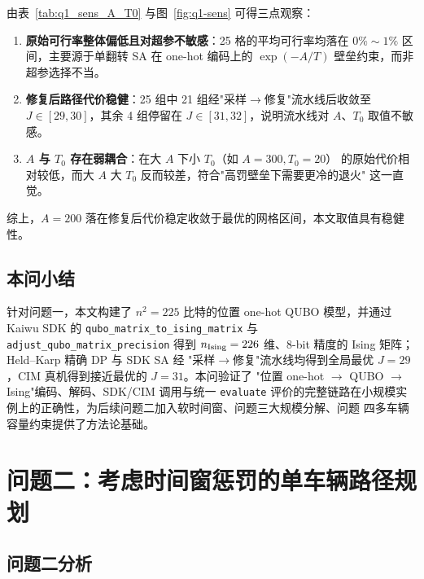 \documentclass[UTF8,12pt,a4paper]{ctexart}
\begin{document}
由表~\ref{tab:q1_sens_A_T0} 与图~\ref{fig:q1-sens} 可得三点观察：
\begin{enumerate}
  \item \textbf{原始可行率整体偏低且对超参不敏感}：25 格的平均可行率均落在 $0\%\sim 1\%$
    区间，主要源于单翻转 SA 在 one-hot 编码上的 $\exp(-A/T)$ 壁垒约束，而非超参选择不当。
  \item \textbf{修复后路径代价稳健}：25 组中 21 组经"采样$\to$修复"流水线后收敛至
    $J\in[29,30]$，其余 4 组停留在 $J\in[31,32]$，说明流水线对 $A$、$T_{0}$ 取值不敏感。
  \item \textbf{$A$ 与 $T_{0}$ 存在弱耦合}：在大 $A$ 下小 $T_{0}$（如 $A=300,T_{0}=20$）
    的原始代价相对较低，而大 $A$ 大 $T_{0}$ 反而较差，符合"高罚壁垒下需要更冷的退火"
    这一直觉。
\end{enumerate}
综上，$A=200$ 落在修复后代价稳定收敛于最优的网格区间，本文取值具有稳健性。

\subsection{本问小结}

针对问题一，本文构建了 $n^{2}=225$ 比特的位置 one-hot QUBO 模型，并通过 Kaiwu SDK 的
\texttt{qubo\_matrix\_to\_ising\_matrix} 与 \texttt{adjust\_qubo\_matrix\_precision}
得到 $n_{\rm Ising}=226$ 维、8-bit 精度的 Ising 矩阵；Held--Karp 精确 DP 与 SDK SA 经
"采样$\to$修复"流水线均得到全局最优 $J=29$，CIM 真机得到接近最优的 $J=31$。本问验证了
"位置 one-hot $\to$ QUBO $\to$ Ising"编码、解码、SDK/CIM 调用与统一 \texttt{evaluate}
评价的完整链路在小规模实例上的正确性，为后续问题二加入软时间窗、问题三大规模分解、问题
四多车辆容量约束提供了方法论基础。

\setcounter{section}{6}

\section{问题二：考虑时间窗惩罚的单车辆路径规划}
\label{sec:q2}

\subsection{问题二分析}
\end{document}
